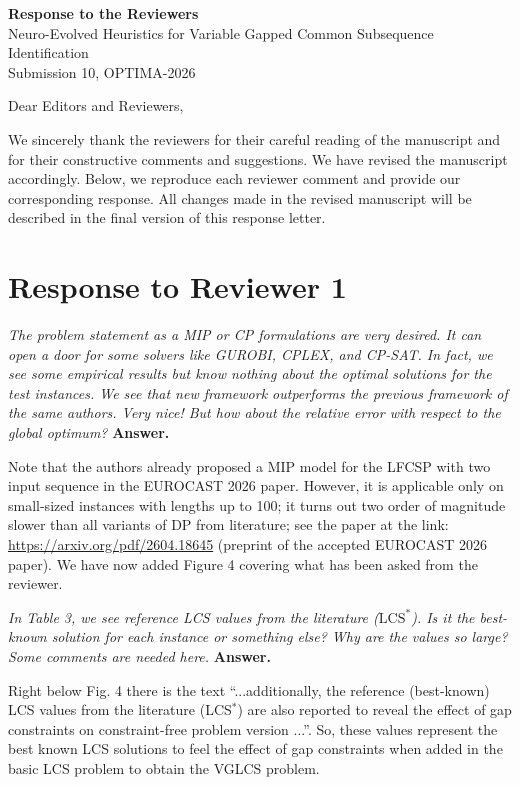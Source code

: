 \documentclass[11pt,a4paper]{article}
\renewenvironment{leftbar}{%
  \def\FrameCommand{\textcolor{reviewbar}{\vrule width 3pt}\hspace{10pt}}%
  \MakeFramed{\advance\hsize-\width\FrameRestore}%
}{\endMakeFramed}
\newcommand{\reviewcomment}[1]{%
\begin{leftbar}
\textit{#1}
\end{leftbar} \textbf{Answer.} 
}
\begin{document}
\begin{center}
    {\Large\bfseries Response to the Reviewers}\\[0.7em]
    {\large Neuro-Evolved Heuristics for Variable Gapped Common Subsequence Identification}\\[0.3em]
    Submission 10, OPTIMA-2026
\end{center}

\vspace{1em}

Dear Editors and Reviewers,

We sincerely thank the reviewers for their careful reading of the manuscript and for their constructive comments and suggestions. We have revised the manuscript accordingly. Below, we reproduce each reviewer comment and provide our corresponding response. All changes made in the revised manuscript will be described in the final version of this response letter.

\section*{Response to Reviewer 1}

\reviewcomment{The problem statement as a MIP or CP formulations are very desired. It can open a door for some solvers like GUROBI, CPLEX, and CP-SAT. In fact, we see some empirical results but know nothing about the optimal solutions for the test instances. We see that new framework outperforms the previous framework of the same authors. Very nice! But how about the relative error with respect to the global optimum?}

Note that the authors already proposed a MIP model for the LFCSP with two input sequence in the EUROCAST 2026 paper. However, it is applicable only on small-sized instances with lengths up to 100; it turns out two order of magnitude slower than all variants of DP from literature; see the paper at the link: \url{https://arxiv.org/pdf/2604.18645} (preprint of the accepted EUROCAST 2026 paper). We have now added Figure 4 covering what has been asked from the reviewer.

\reviewcomment{In Table 3, we see reference LCS values from the literature ($\mathrm{LCS}^{*}$). Is it the best-known solution for each instance or something else? Why are the values so large? Some comments are needed here.}

Right below Fig. 4 there is the text ``...additionally, the reference (best-known) LCS values from the literature (LCS$^*$) are also reported to reveal the effect of gap constraints on constraint-free problem version ...''. So, these values represent the best known LCS solutions to feel the effect of gap constraints when added in the basic LCS problem to obtain the VGLCS problem. 
\end{document}

